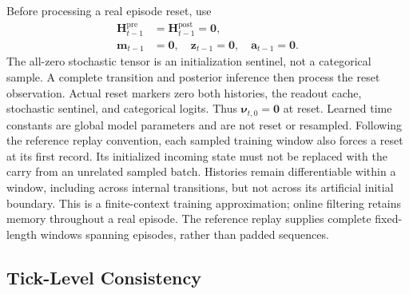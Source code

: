 \documentclass{article}
\begin{document}
Before processing a real episode reset, use
\begin{equation}
\begin{aligned}
\mathbf H_{t-1}^{\mathrm{pre}}&=\mathbf H_{t-1}^{\mathrm{post}}=\mathbf0,\\
\mathbf m_{t-1}&=\mathbf0,\quad\mathbf z_{t-1}=\mathbf0,\quad\mathbf a_{t-1}=\mathbf0.
\end{aligned}
\label{eq:zero_state_reset}
\end{equation}
The all-zero stochastic tensor is an initialization sentinel, not a categorical sample. A complete transition and posterior inference then process the reset observation. Actual reset markers zero both histories, the readout cache, stochastic sentinel, and categorical logits. Thus $\boldsymbol\nu_{t,0}=\mathbf0$ at reset. Learned time constants are global model parameters and are not reset or resampled. Following the reference replay convention, each sampled training window also forces a reset at its first record. Its initialized incoming state must not be replaced with the carry from an unrelated sampled batch. Histories remain differentiable within a window, including across internal transitions, but not across its artificial initial boundary. This is a finite-context training approximation; online filtering retains memory throughout a real episode. The reference replay supplies complete fixed-length windows spanning episodes, rather than padded sequences.

\subsection{Tick-Level Consistency}
\end{document}
